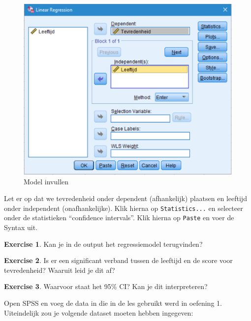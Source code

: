 \documentclass[
]{book}
\theoremstyle{definition}
\theoremstyle{definition}
\theoremstyle{definition}
\newtheorem{exercise}{Exercise}[chapter]
\theoremstyle{definition}
\theoremstyle{remark}
\begin{document}
\begin{figure}
\includegraphics[width=1\linewidth]{img/ex_spss_lm_2} \caption{Model invullen}\label{fig:exspsslm2}
\end{figure}

Let er op dat we tevredenheid onder dependent (afhankelijk) plaatsen en leeftijd onder independent (onafhankelijke). Klik hierna op \texttt{Statistics...} en selecteer onder de statistieken ``confidence intervals''. Klik hierna op \texttt{Paste} en voer de Syntax uit.

\begin{exercise}
Kan je in de output het regressiemodel terugvinden?
\end{exercise}

\begin{exercise}
Is er een significant verband tussen de leeftijd en de score voor tevredenheid? Waaruit leid je dit af?
\end{exercise}

\begin{exercise}
Waarvoor staat het 95\% CI? Kan je dit interpreteren?
\end{exercise}

Open SPSS en voeg de data in die in de les gebruikt werd in oefening 1. Uiteindelijk zou je volgende dataset moeten hebben ingegeven:
\end{document}
